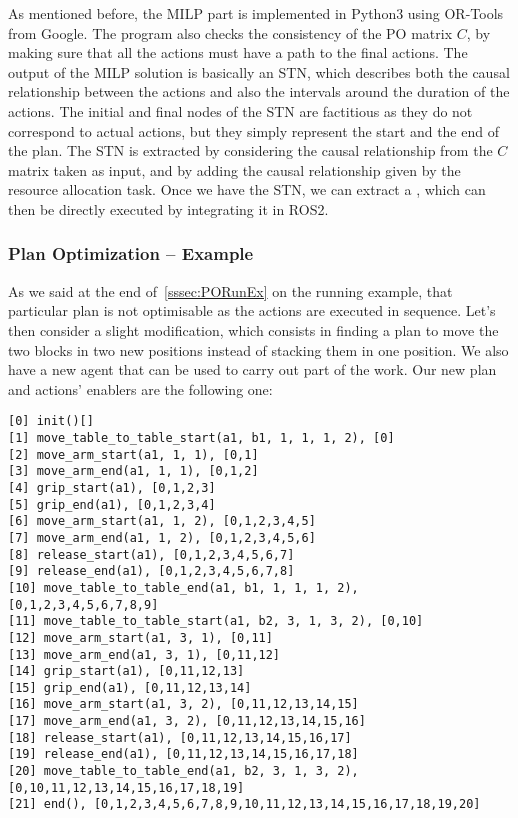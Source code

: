 As mentioned before, the MILP part is implemented in Python3 using OR-Tools from Google. The program also checks the consistency of the PO matrix $C$, by making sure that all the actions must have a path to the final actions. 
The output of the MILP solution is basically an STN, which describes both the causal relationship between the actions and also the intervals around the duration of the actions. The initial and final nodes of the STN are factitious as they do not correspond to actual actions, but they simply represent the start and the end of the plan.
The STN is extracted by considering the causal relationship from the $C$ matrix taken as input, and by adding the causal relationship given by the resource allocation task. 
Once we have the STN, we can extract a \bt, which can then be directly executed by integrating it in ROS2. 

\subsubsection{Plan Optimization -- Example}
\label{sssec:PORunExample}
As we said at the end of~\autoref{sssec:PORunEx}  on the running example, that particular plan is not optimisable as the actions are executed in sequence. Let's then consider a slight modification, which consists in finding a plan to move the two blocks in two new positions instead of stacking them in one position. We also have a new agent that can be used to carry out part of the work. 
Our new plan and actions' enablers are the following one:

\begin{verbatim}
[0] init()[]
[1] move_table_to_table_start(a1, b1, 1, 1, 1, 2), [0]
[2] move_arm_start(a1, 1, 1), [0,1]
[3] move_arm_end(a1, 1, 1), [0,1,2]
[4] grip_start(a1), [0,1,2,3]
[5] grip_end(a1), [0,1,2,3,4]
[6] move_arm_start(a1, 1, 2), [0,1,2,3,4,5]
[7] move_arm_end(a1, 1, 2), [0,1,2,3,4,5,6]
[8] release_start(a1), [0,1,2,3,4,5,6,7]
[9] release_end(a1), [0,1,2,3,4,5,6,7,8]
[10] move_table_to_table_end(a1, b1, 1, 1, 1, 2), [0,1,2,3,4,5,6,7,8,9]
[11] move_table_to_table_start(a1, b2, 3, 1, 3, 2), [0,10]
[12] move_arm_start(a1, 3, 1), [0,11]
[13] move_arm_end(a1, 3, 1), [0,11,12]
[14] grip_start(a1), [0,11,12,13]
[15] grip_end(a1), [0,11,12,13,14]
[16] move_arm_start(a1, 3, 2), [0,11,12,13,14,15]
[17] move_arm_end(a1, 3, 2), [0,11,12,13,14,15,16]
[18] release_start(a1), [0,11,12,13,14,15,16,17]
[19] release_end(a1), [0,11,12,13,14,15,16,17,18]
[20] move_table_to_table_end(a1, b2, 3, 1, 3, 2), [0,10,11,12,13,14,15,16,17,18,19]
[21] end(), [0,1,2,3,4,5,6,7,8,9,10,11,12,13,14,15,16,17,18,19,20]
\end{verbatim}

